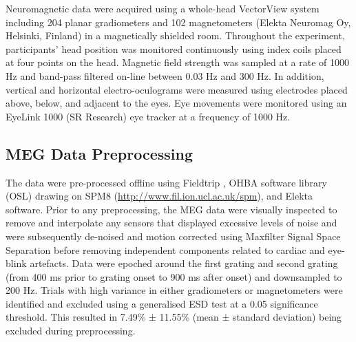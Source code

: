 \documentclass{article}
\begin{document}
Neuromagnetic data were acquired using a whole-head VectorView system including 204 planar gradiometers and 102 magnetometers (Elekta Neuromag Oy, Helsinki, Finland) in a magnetically shielded room. Throughout the experiment, participants’ head position was monitored continuously using index coils placed at four points on the head. Magnetic field strength was sampled at a rate of 1000 Hz and band-pass filtered on-line between 0.03 Hz and 300 Hz. In addition, vertical and horizontal electro-oculograms were measured using electrodes placed above, below, and adjacent to the eyes. Eye movements were monitored using an EyeLink 1000 (SR Research) eye tracker at a frequency of 1000 Hz.\\


\subsection{MEG Data Preprocessing} 
The data were pre-processed offline using Fieldtrip \parencite{Oostenveld2011}, OHBA software library (OSL) drawing on SPM8 (\url{http://www.fil.ion.ucl.ac.uk/spm}), and Elekta software. Prior to any preprocessing, the MEG data were visually inspected to remove and interpolate any sensors that displayed excessive levels of noise and were subsequently de-noised and motion corrected using Maxfilter Signal Space Separation \parencite{Taulu2004} before removing independent components related to cardiac and eye-blink artefacts. Data were epoched around the first grating and second grating (from 400 ms prior to grating onset to 900 ms after onset) and downsampled to 200 Hz. Trials with high variance in either gradiometers or magnetometers were identified and excluded using a generalised ESD \parencite[extreme studentised deviate;][]{Rosner1983} test at a 0.05 significance threshold. This resulted in 7.49\% ± 11.55\% (mean ± standard deviation) being excluded during preprocessing.  \\
\end{document}
